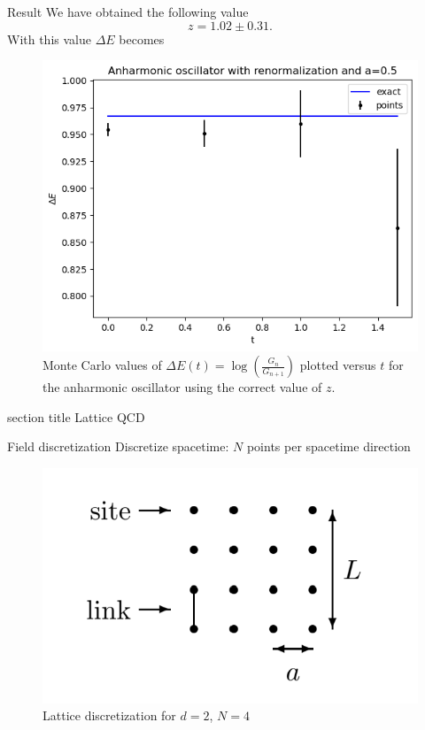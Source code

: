 \documentclass{beamer}
\begin{document}
\begin{frame}{Result}
    We have obtained the following value
    \begin{equation*}
        z = 1.02 \pm 0.31.
    \end{equation*}
    With this value $\Delta E$ becomes
    \begin{figure}
        \centering
        \includegraphics[width=0.5\linewidth]{anharmonic_oscillator_with_correct_z.png}
        \caption{Monte Carlo values of $\Delta E(t) = \log\left( \frac{G_n}{G_{n+1}} \right)$ plotted versus $t$ for the anharmonic oscillator using the correct value of $z$.}
        \label{fig:anharmonic_oscillator_with_correct_z}
    \end{figure}
\end{frame}


\begin{frame}
    \begingroup
      \centering
      \begin{beamercolorbox}[sep=12pt,center,colsep=-4bp,rounded=true,shadow=true]{section title}
        Lattice QCD\par
      \end{beamercolorbox}
    \endgroup
  \end{frame}



\begin{frame}{Field discretization}
    Discretize spacetime: $N$ points per spacetime direction
    \begin{figure}
        \centering
        \includegraphics[width=0.5\linewidth]{lattice.png}
        \caption{Lattice discretization for $d=2$, $N=4$}
        \label{fig:lattice}
    \end{figure}
\end{frame}
\end{document}
